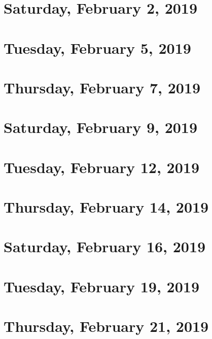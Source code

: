 \documentclass[reqno]{amsart}
\begin{document}
\section{Saturday, February 2, 2019}
    
    
\section{Tuesday, February 5, 2019}
    

\section{Thursday, February 7, 2019}
    

\section{Saturday, February 9, 2019}
    
    
\section{Tuesday, February 12, 2019}
    

\section{Thursday, February 14, 2019}
    

\section{Saturday, February 16, 2019}
    

\section{Tuesday, February 19, 2019}
    

\section{Thursday, February 21, 2019}
    
\end{document}
